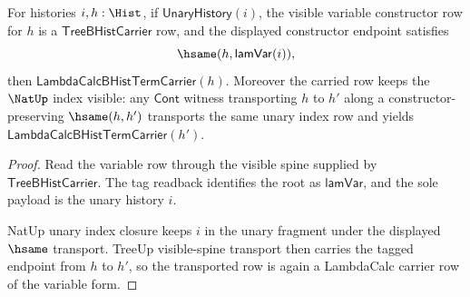 \begin{theorem}
\label{thm:lambdacalc-variable-constructor-carrier}
For histories $i,h:\Hist$, if $\mathsf{UnaryHistory}(i)$, the visible variable
constructor row for $h$ is a $\mathsf{TreeBHistCarrier}$ row, and the displayed
constructor endpoint satisfies
$$
\hsame(h,\mathsf{lamVar}(i)),
$$
then $\mathsf{LambdaCalcBHistTermCarrier}(h)$. Moreover the carried row keeps
the $\NatUp$ index visible: any $\mathsf{Cont}$ witness transporting $h$ to
$h'$ along a constructor-preserving $\hsame(h,h')$ transports the same unary
index row and yields $\mathsf{LambdaCalcBHistTermCarrier}(h')$.
\end{theorem}
\begin{proof}
Read the variable row through the visible spine supplied by
$\mathsf{TreeBHistCarrier}$. The tag readback identifies the root as
$\mathsf{lamVar}$, and the sole payload is the unary history $i$.

NatUp unary index closure keeps $i$ in the unary fragment under the displayed
$\hsame$ transport. TreeUp visible-spine transport then carries the tagged
endpoint from $h$ to $h'$, so the transported row is again a LambdaCalc carrier
row of the variable form.
\end{proof}

